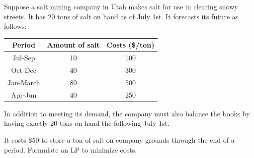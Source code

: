 \documentclass{article}
\begin{document}
\begin{eg}
    Suppose a salt mining company in Utah makes salt for use in clearing
    snowy streets. It has 20 tons of salt on hand as of July 1st. It forecasts
    its future as follows: \\
    \begin{tabular}{| c | c | c |}
        \hline
        Period & Amount of salt & Costs (\$/ton) \\
        \hline
        Jul-Sep & 10 & 100 \\
        \hline
        Oct-Dec & 40 & 300 \\
        \hline
        Jan-March & 80 & 500 \\
        \hline
        Apr-Jun & 40 & 250 \\
        \hline
    \end{tabular}

    In addition to meeting its demand, the company must also balance the books 
    by having exactly 20 tons on hand the following July 1st.

    It costs \$50 to store a ton of salt on company grounds through the end of
    a period. Formulate an LP to minimize costs.
\end{eg}
\end{document}
